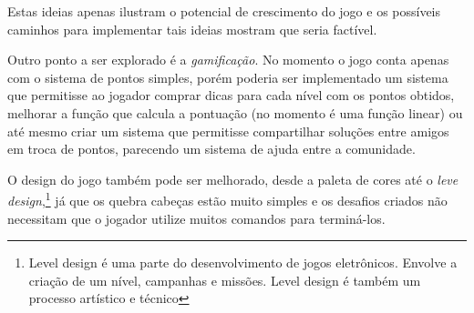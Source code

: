 Estas ideias apenas ilustram o potencial de crescimento do jogo e os possíveis
caminhos para implementar tais ideias mostram que seria factível.

Outro ponto a ser explorado é a \textit{gamificação}. No momento o jogo conta 
apenas com o sistema de pontos simples, porém poderia ser implementado um 
sistema que permitisse ao jogador comprar dicas para cada nível com os pontos 
obtidos, melhorar a função que calcula a pontuação (no momento é uma função
linear) ou até mesmo criar um sistema que permitisse compartilhar soluções entre
amigos em troca de pontos, parecendo um sistema de ajuda entre a comunidade.

O design do jogo também pode ser melhorado, desde a paleta de cores até o 
\textit{leve design},\footnote{Level design é uma parte do desenvolvimento de 
jogos eletrônicos. Envolve a criação de um nível, campanhas e missões.
Level design é também um processo artístico e técnico} já que os quebra cabeças
estão muito simples e os desafios criados não necessitam que o jogador utilize 
muitos comandos para terminá-los.
